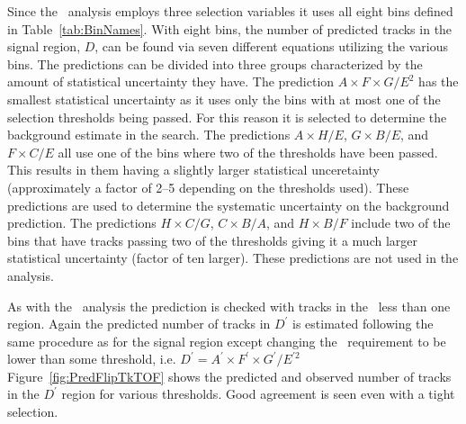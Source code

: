 Since the \tktof\ analysis employs three selection variables it uses all eight bins defined in Table~\ref{tab:BinNames}.
With eight bins, the number of predicted tracks in the signal region, $D$, can be found via seven different equations utilizing the various bins.
The predictions can be divided into three groups characterized by the amount of statistical uncertainty they have.
The prediction $A\times F\times G/E^2$ has the smallest statistical uncertainty as it uses only the bins with at most one of the selection thresholds being passed.
For this reason it is selected to determine the background estimate in the search.
The predictions $A\times H / E$, $G\times B / E$, and $F\times C / E$ all use one of the bins where two of the thresholds have been passed.
This results in them having a slightly larger statistical unceretainty (approximately a factor of 2--5 depending on the thresholds used).
These predictions are used to determine the systematic uncertainty on the background prediction.
The predictions $H\times C / G$, $C\times B / A$, and $H\times B / F$ include two of the bins that have tracks passing two of the thresholds giving it a much larger
statistical uncertainty (factor of ten larger). These predictions are not used in the analysis.

As with the \muononly\ analysis the prediction is checked with tracks in the \invbeta\ less than one region. Again the predicted number of tracks in
$D^{\prime}$ is estimated following the same procedure as for the signal region except changing the \invbeta\ requirement to be lower than some threshold,
i.e. $D^{\prime} = A^{\prime}\times F^{\prime}\times G^{\prime} / E^{\prime 2}$
Figure~\ref{fig:PredFlipTkTOF} shows the predicted and observed number of tracks in the $D^{\prime}$ region for various thresholds. Good agreement is seen
even with a tight selection.


